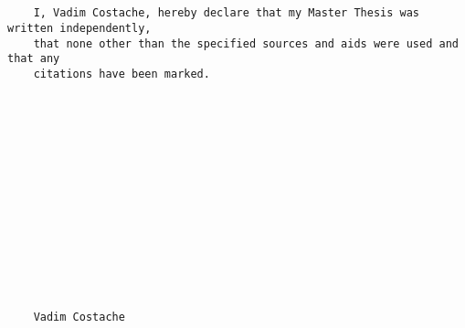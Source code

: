 
	
	
	
	
	
	\begin{verbatim}
	
	
	
	
	
	
	
	
	
	
	
	I, Vadim Costache, hereby declare that my Master Thesis was written	independently, 
	that none other than the specified sources and aids were used and that any
	citations have been marked.
	
	
	
	
	
	
	
	
	
	
	
	
	
	
	
	Vadim Costache

	
	
	
	
	
	
	
	
	
	
	
	
	
	
	
	\end{verbatim}